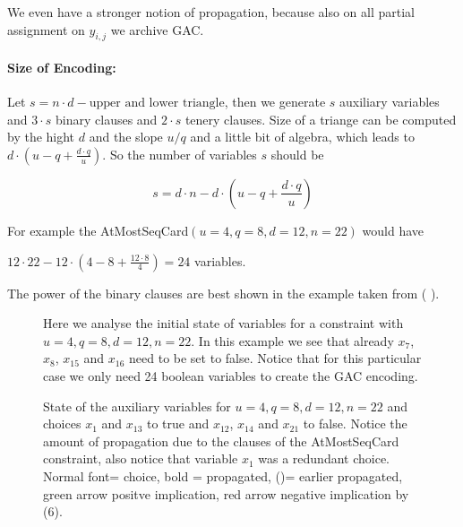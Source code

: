 \documentclass[]{llncs}
\newcommand{\TODO}[1]{ {\color{red}{#1} }}
\begin{document}
We even have a stronger notion of propagation, because also on all
partial assignment on $y_{i,j}$ we archive GAC. 

\paragraph{Size of Encoding: } Let $s = n\cdot d-\text{upper and lower
triangle}$, then we generate $s$ auxiliary variables and $3\cdot s$
binary clauses and $2\cdot s$ tenery clauses. Size of a triange can be
computed by the hight $d$ and the slope $u/q$ and a little bit of
algebra, which leads to $d\cdot(u-q+\frac{d \cdot q}{u}) $. So the
number of variables $s$ should be

$$ s = d \cdot n - d \cdot(u-q+\frac{d \cdot q}{u}) $$

For example the AtMostSeqCard$(u=4,q=8,d=12,n=22)$ would have 

$ 12\cdot 22- 12\cdot ( 4-8+\frac{12 \cdot 8}{4}) = 24$ variables. 


%


The power of the binary clauses are best shown in the example taken from
(\TODO{ref}). 



\begin{figure}
\centering 
\caption{Here we analyse the initial state of variables for a constraint
    with $u=4,q=8,d=12,n=22$. In this example we see that already
    $x_{7}$, $x_{8}$, $x_{15}$ and $x_{16}$ need to be set to false.
    Notice that for this particular case we only need 24 boolean
    variables to create the GAC encoding.}

\end{figure}

\begin{figure}
\centering 
\caption{State of the auxiliary variables for $u=4,q=8,d=12,n=22$ and
    choices $x_{1}$ and $x_{13}$ to true and $x_{12}$, $x_{14}$ and
    $x_{21}$ to false. Notice the amount of propagation due to the
    clauses of the AtMostSeqCard constraint, also notice that variable
$x_{1}$ was a redundant choice. Normal font= choice, bold = propagated,
()= earlier propagated, green arrow positve implication, red arrow
negative implication by (6).}

\end{figure}
\end{document}
